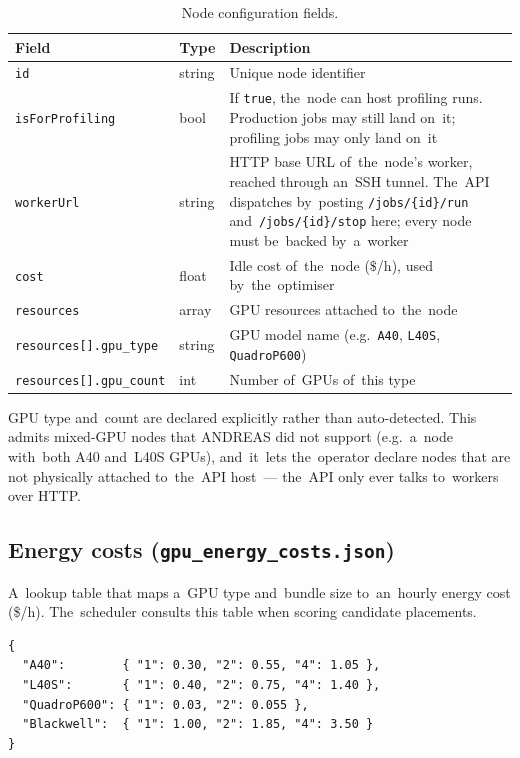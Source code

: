 \begin{table}[H]
\centering
\begin{tabularx}{\textwidth}{@{}l l X@{}}
\toprule
\textbf{Field} & \textbf{Type} & \textbf{Description} \\
\midrule
\texttt{id}                     & string         & Unique node identifier \\
\texttt{isForProfiling}         & bool           & If \texttt{true}, the~node can host profiling runs.  Production jobs may still land on~it; profiling jobs may only land on~it \\
\texttt{workerUrl}              & string         & HTTP base URL of~the~node's worker, reached through an~SSH tunnel.  The~API dispatches by~posting \texttt{/jobs/\{id\}/run} and~\texttt{/jobs/\{id\}/stop} here; every node must be~backed by~a~worker \\
\texttt{cost}                   & float          & Idle cost of~the~node ($\$$/h), used by~the~optimiser \\
\texttt{resources}              & array          & GPU resources attached to~the~node \\
\texttt{resources[].gpu\_type}  & string         & GPU model name (e.g.~\texttt{A40}, \texttt{L40S}, \texttt{QuadroP600}) \\
\texttt{resources[].gpu\_count} & int            & Number of~GPUs of~this type \\
\bottomrule
\end{tabularx}
\caption{Node configuration fields.}\label{tab:node-config}
\end{table}

GPU type and~count are declared explicitly rather than auto-detected.
This admits mixed-GPU nodes that ANDREAS did not support (e.g.~a~node
with~both A40 and~L40S GPUs), and~it~lets the~operator declare nodes
that are not physically attached to~the~API host~--- the~API only ever
talks to~workers over HTTP.

\subsection{Energy costs (\texttt{gpu\_energy\_costs.json})}

A~lookup table that maps a~GPU type and~bundle size to~an~hourly energy
cost (\$/h).  The~scheduler consults this table when scoring candidate
placements.

\begin{lstlisting}[language={}, numbers=none]
{
  "A40":        { "1": 0.30, "2": 0.55, "4": 1.05 },
  "L40S":       { "1": 0.40, "2": 0.75, "4": 1.40 },
  "QuadroP600": { "1": 0.03, "2": 0.055 },
  "Blackwell":  { "1": 1.00, "2": 1.85, "4": 3.50 }
}
\end{lstlisting}

